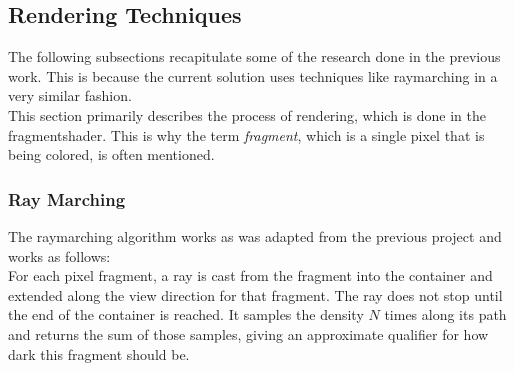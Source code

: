 \subsection{Rendering Techniques}
The following subsections recapitulate some of the research done in the previous work.
This is because the current solution uses techniques like \gls{raymarching} in a very similar fashion.
\\
This section primarily describes the process of rendering, which is done in the \gls{fragmentshader}.
This is why the term \emph{\gls{fragment}}, which is a single pixel that is being colored, is often mentioned. 

\subsubsection{Ray Marching}
The \gls{raymarching} algorithm works as was adapted from the previous project and works as follows:
\\
For each pixel \gls{fragment}, a ray is cast from the \gls{fragment} into the container and extended along the view direction for that \gls{fragment}.
The ray does not stop until the end of the container is reached.
It samples the density $N$ times along its path and returns the sum of those samples, giving an approximate qualifier for how dark this \gls{fragment} should be.

